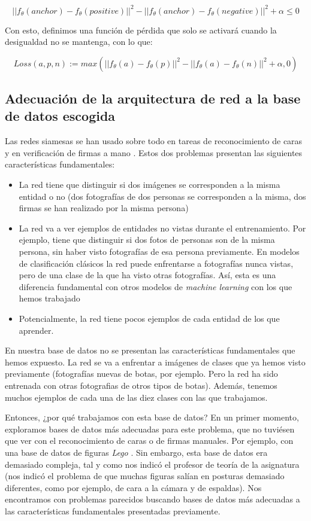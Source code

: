 \documentclass[11pt]{article}
\begin{document}
$$||f_{\theta}(anchor) - f_{\theta}(positive)||^2 - ||f_{\theta}(anchor) - f_{\theta}(negative)||^2 + \alpha \leq 0$$

Con esto, definimos una función de pérdida que solo se activará cuando la desigualdad no se mantenga, con lo que:

$$Loss(a, p, n) := max(||f_{\theta}(a) - f_{\theta}(p)||^2 - ||f_{\theta}(a) - f_{\theta}(n)||^2 + \alpha, 0)$$

\subsection{Adecuación de la arquitectura de red a la base de datos escogida} \label{adecuacion_arquitectura_red:seccion}

Las redes siamesas se han usado sobre todo en tareas de reconocimiento de caras y en verificación de firmas a mano \cite{siamese_wikipedia:online}. Estos dos problemas presentan las siguientes características fundamentales:

\begin{itemize}
  \item La red tiene que distinguir si dos imágenes se corresponden a la misma entidad o no (dos fotografías de dos personas se corresponden a la misma, dos firmas se han realizado por la misma persona)
  \item La red va a ver ejemplos de entidades no vistas durante el entrenamiento. Por ejemplo, tiene que distinguir si dos fotos de personas son de la misma persona, sin haber visto fotografías de esa persona previamente. En modelos de clasificación clásicos la red puede enfrentarse a fotografías nunca vistas, pero de una clase de la que ha visto otras fotografías. Así, esta es una diferencia fundamental con otros modelos de \emph{machine learning} con los que hemos trabajado 
  \item Potencialmente, la red tiene pocos ejemplos de cada entidad de los que aprender. 
\end{itemize}

En nuestra base de datos no se presentan las características fundamentales que hemos expuesto. La red se va a enfrentar a imágenes de clases que ya hemos visto previamente (fotografías nuevas de botas, por ejemplo. Pero la red ha sido entrenada con otras fotografias de otros tipos de botas). Además, tenemos muchos ejemplos de cada una de las diez clases con las que trabajamos.

Entonces, ¿por qué trabajamos con esta base de datos? En un primer momento, exploramos bases de datos más adecuadas para este problema, que no tuviésen que ver con el reconocimiento de caras o de firmas manuales. Por ejemplo, con una base de datos de figuras \emph{Lego} \cite{lego_database:online}. Sin embargo, esta base de datos era demasiado compleja, tal y como nos indicó el profesor de teoría de la asignatura (nos indicó el problema de que muchas figuras salían en posturas demasiado diferentes, como por ejemplo, de cara a la cámara y de espaldas). Nos encontramos con problemas parecidos buscando bases de datos más adecuadas a las características fundamentales presentadas previamente.
\end{document}
